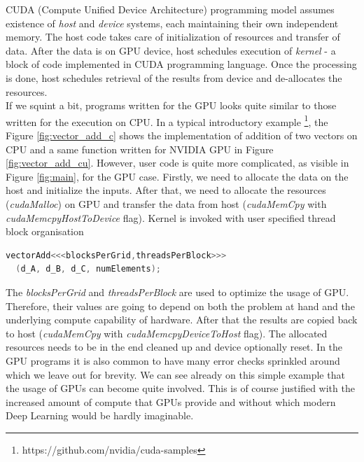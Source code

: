 \documentclass{article}
\begin{document}
CUDA (Compute Unified Device Architecture) programming model assumes existence of \textit{host} and \textit{device}
systems, each maintaining their own independent memory. The host code takes care of initialization of resources and
transfer of data. After the data is on GPU device, host schedules execution of \textit{kernel} - a block of code
implemented in CUDA programming language. Once the processing is done, host schedules retrieval of the results from device and de-allocates the resources. \\
If we squint a bit, programs written for the GPU looks quite similar to those written for the execution on CPU. 
In a typical introductory example \footnote{https://github.com/nvidia/cuda-samples}, the Figure \ref{fig:vector_add_c} shows the implementation of addition of two vectors on CPU and a same function written for NVIDIA GPU in Figure \ref{fig:vector_add_cu}.
However, user code is quite more complicated,  as visible in Figure \ref{fig:main}, for the GPU case.
Firstly, we need to allocate the data on the host and initialize the inputs.
After that, we need to allocate the resources (\textit{cudaMalloc}) on GPU and transfer the data from host (\textit{cudaMemCpy} with \textit{cudaMemcpyHostToDevice} flag).
Kernel is invoked with user specified thread block organisation 
\begin{lstlisting}[language=C]
  vectorAdd<<<blocksPerGrid,threadsPerBlock>>>
  (d_A, d_B, d_C, numElements);
\end{lstlisting}
The \textit{blocksPerGrid} and \textit{threadsPerBlock} are used to optimize the usage of GPU.
Therefore, their values are going to depend on both the problem at hand and the underlying compute capability of hardware.
After that the results are copied back to host (\textit{cudaMemCpy} with \textit{cudaMemcpyDeviceToHost} flag).
The allocated resources needs to be in the end cleaned up and device optionally reset.
In the GPU programs it is also common to have many error checks sprinkled around which we leave out for brevity.
We can see already on this simple example that the usage of GPUs can become quite involved.
This is of course justified with the increased amount of compute that GPUs provide and without which
modern Deep Learning would be hardly imaginable. 
\end{document}
